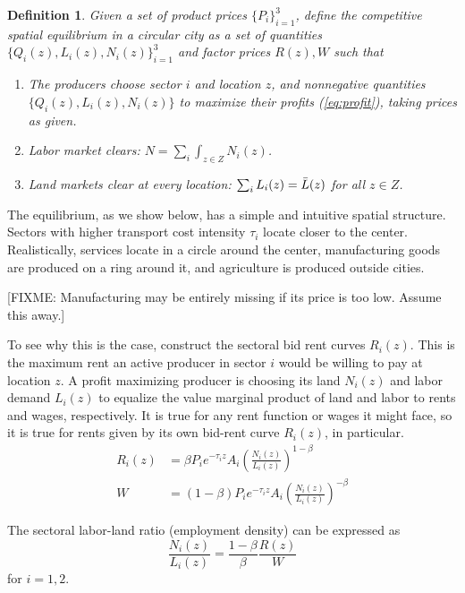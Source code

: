 \documentclass[12pt]{article}
\newtheorem{definition}{Definition}
\begin{document}
\begin{definition}
Given a set of product prices $\{P_i\}_{i=1}^3$, define the \emph{competitive spatial equilibrium} in a circular city as a set of quantities $\{Q_i(z), L_i(z), N_i(z)\}_{i=1}^3$ and factor prices $R(z), W$ such that
\begin{enumerate}
    \item The producers choose sector $i$ and location $z$, and nonnegative quantities $\{Q_i(z), L_i(z), N_i(z)\}$ to maximize their profits (\ref{eq:profit}), taking prices as given.
    \item Labor market clears: $N=\sum_i\int_{z\in Z} N_i(z)$.
    \item Land markets clear at every location: $\sum_iL_i(z)=\Bar L(z)$ for all $z\in Z$.
\end{enumerate}
\end{definition}
The equilibrium, as we show below, has a simple and intuitive spatial structure. Sectors with higher transport cost intensity $\tau_i$ locate closer to the center. Realistically, services locate in a circle around the center, manufacturing goods are produced on a ring around it, and agriculture is produced outside cities.

[FIXME: Manufacturing may be entirely missing if its price is too low. Assume this away.]

To see why this is the case, construct the sectoral bid rent curves $R_i(z)$. This is the maximum rent an active producer in sector $i$ would be willing to pay at location $z$. %
A profit maximizing producer is choosing its land $N_i(z)$ and labor demand $L_i(z)$ to equalize the value marginal product of land and labor to rents and wages, respectively. It is true for any rent function or wages it might face, so it is true for rents given by its own bid-rent curve $R_i(z)$, in particular.
\begin{align}
R_i(z) &=\beta P_ie^{-\tau_i z}A_i \left(\frac{N_i(z)}{L_i(z)}\right)^{1-\beta}\\
W &=(1-\beta) P_ie^{-\tau_i z}A_i \left(\frac{N_i(z)}{L_i(z)}\right)^{-\beta}
\end{align}

The sectoral labor-land ratio (employment density) can be expressed as
\begin{equation}
\label{eq:EmpDens}
\frac{N_i(z)}{L_i(z)} = \frac{1-\beta}{\beta}\frac{R(z)}{W}
\end{equation}
for $i=1,2$.
\end{document}
